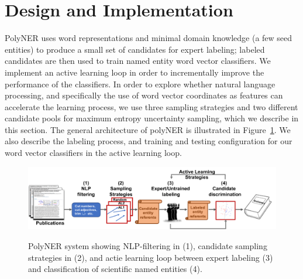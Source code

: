 \section{Design and Implementation}
\label{sect:apner_architecture}

PolyNER uses word representations and minimal domain knowledge (a few
seed entities) to produce a small set of candidates for expert labeling;
labeled candidates are then used to train named entity word vector classifiers.
We implement an active learning loop in order to incrementally improve the performance of the classifiers.
In order to explore whether natural language processing, and specifically the use of word vector coordinates as features can accelerate the learning process,
we use three sampling strategies and two different candidate pools for maximum entropy uncertainty sampling, which we describe in this section.
The general architecture of polyNER is illustrated in Figure~\ref{fig:architecture}.
We also describe the labeling process, and training and testing configuration for our word vector classifiers in the active learning loop. 

\begin{figure}[!t]
{\includegraphics[width=\textwidth]{figures/architecture.pdf}}
\caption{\label{fig:architecture} PolyNER system showing NLP-filtering in (1), candidate sampling strategies in (2), and actie learning loop between expert labeling (3) and classification of scientific named entities (4). 
}
\end{figure}

